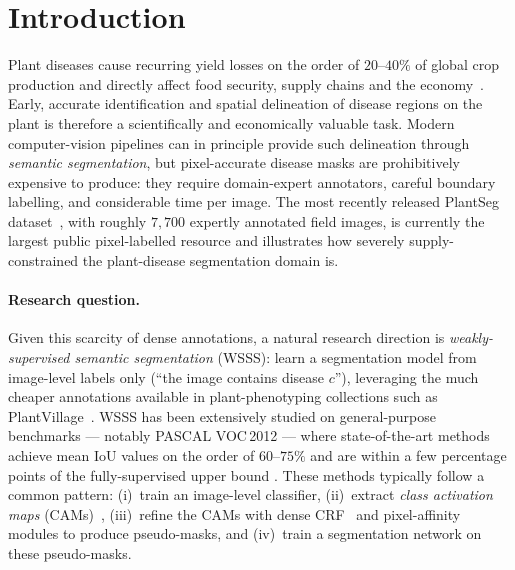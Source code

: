 \documentclass[11pt,a4paper]{article}
\begin{document}
\newpage
{}
{\small{}\tableofcontents}
\newpage
{}
\setcounter{page}{1}

\section{Introduction}
\label{sec:intro}

Plant diseases cause recurring yield losses on the order of
$20$--$40\%$ of global crop production and directly affect food security,
supply chains and the economy~\citep{plantseg,qin_severity,garden}. Early,
accurate identification and spatial delineation of disease regions on the
plant is therefore a scientifically and economically valuable task.
Modern computer-vision pipelines can in principle provide such delineation
through \emph{semantic segmentation}, but pixel-accurate disease masks are
prohibitively expensive to produce: they require domain-expert annotators,
careful boundary labelling, and considerable time per image. The most
recently released PlantSeg dataset~\citep{plantseg}, with roughly
$7{,}700$ expertly annotated field images, is currently the largest public
pixel-labelled resource and illustrates how severely supply-constrained
the plant-disease segmentation domain is.

\paragraph{Research question.}
Given this scarcity of dense annotations, a natural research direction is
\emph{weakly-supervised semantic segmentation} (WSSS): learn a segmentation
model from image-level labels only (``the image contains disease $c$''),
leveraging the much cheaper annotations available in plant-phenotyping
collections such as PlantVillage~\citep{plantvillage}. WSSS has been
extensively studied on general-purpose benchmarks — notably PASCAL
VOC\,2012 — where state-of-the-art methods achieve mean IoU values on the
order of $60$--$75\%$ and are within a few percentage points of the
fully-supervised upper bound \citep{sec,affinitynet,weaktr,weakclip}. These
methods typically follow a common pattern: (i)~train an image-level
classifier, (ii)~extract \emph{class activation maps}
(CAMs)~\citep{cam,gradcam}, (iii)~refine the CAMs with dense
CRF~\citep{densecrf} and pixel-affinity~\citep{affinitynet} modules to
produce pseudo-masks, and (iv)~train a segmentation network on these
pseudo-masks.
\end{document}
